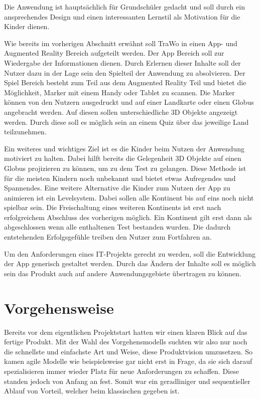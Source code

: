 Die Anwendung ist hauptsächlich für Grundschüler gedacht und soll durch ein ansprechendes Design und einen interessanten Lernstil als Motivation für die Kinder dienen.

Wie bereits im vorherigen Abschnitt erwähnt soll TraWo in einen App- und Augmented Reality Bereich aufgeteilt werden. Der App Bereich soll zur Wiedergabe der Informationen dienen. Durch Erlernen dieser Inhalte soll der Nutzer dazu in der Lage sein den Spielteil der Anwendung zu absolvieren. Der Spiel Bereich besteht zum Teil aus dem Augmented Reality Teil und bietet die Möglichkeit, Marker mit einem Handy oder Tablet zu scannen. Die Marker können von den Nutzern ausgedruckt und auf einer Landkarte oder einen Globus angebracht werden. Auf diesen sollen unterschiedliche 3D Objekte angezeigt werden. Durch diese soll es möglich sein an einem Quiz über das jeweilige Land teilzunehmen.

Ein weiteres und wichtiges Ziel ist es die Kinder beim Nutzen der Anwendung motiviert zu halten. Dabei hilft bereits die Gelegenheit 3D Objekte auf einen Globus projizieren zu können, um zu dem Test zu gelangen. Diese Methode ist für die meisten Kindern noch unbekannt und bietet etwas Aufregendes und Spannendes. Eine weitere Alternative die Kinder zum Nutzen der App zu animieren ist ein Levelsystem. Dabei sollen alle Kontinent bis auf eins noch nicht spielbar sein. Die Freischaltung eines weiteren Kontinents ist erst nach erfolgreichem Abschluss des vorherigen möglich. Ein Kontinent gilt erst dann als abgeschlossen wenn alle enthaltenen Test bestanden wurden. Die dadurch entstehenden Erfolgsgefühle treiben den Nutzer zum Fortfahren an.

Um den Anforderungen eines IT-Projekts gerecht zu werden, soll die Entwicklung der App generisch gestaltet werden. Durch das Ändern der Inhalte soll es möglich sein das Produkt auch auf andere Anwendungsgebiete übertragen zu können.

\section{Vorgehensweise}
Bereits vor dem eigentlichen Projektstart hatten wir einen klaren Blick auf das fertige Produkt.
Mit der Wahl des Vorgehensmodells suchten wir also nur noch die schnellste und einfachste Art und Weise, diese Produktvision umzusetzen. 
So kamen agile Modelle wie beispielsweise  gar nicht erst in Frage, da sie sich darauf spezialisieren immer wieder Platz für neue Anforderungen zu schaffen. 
Diese standen jedoch von Anfang an fest.
Somit war ein geradliniger und sequentieller Ablauf von Vorteil, welcher beim klassischen  gegeben ist. 

